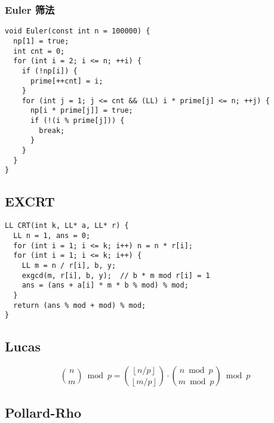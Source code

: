 \documentclass[a4paper,11pt,twoside,fontset = fandol,UTF8]{ctexbook} %
\begin{document}
\subsubsection{Euler 筛法}

\begin{lstlisting}
void Euler(const int n = 100000) {
  np[1] = true;
  int cnt = 0;
  for (int i = 2; i <= n; ++i) {
    if (!np[i]) {
      prime[++cnt] = i;
    }
    for (int j = 1; j <= cnt && (LL) i * prime[j] <= n; ++j) {
      np[i * prime[j]] = true;
      if (!(i % prime[j])) {
        break;
      }
    }
  }
}
\end{lstlisting}

\subsection{EXCRT}

\begin{lstlisting}
LL CRT(int k, LL* a, LL* r) {
  LL n = 1, ans = 0;
  for (int i = 1; i <= k; i++) n = n * r[i];
  for (int i = 1; i <= k; i++) {
    LL m = n / r[i], b, y;
    exgcd(m, r[i], b, y);  // b * m mod r[i] = 1
    ans = (ans + a[i] * m * b % mod) % mod;
  }
  return (ans % mod + mod) % mod;
}
\end{lstlisting}

\subsection{Lucas}
$$
\binom{n}{m}\bmod p = \binom{\left\lfloor n/p \right\rfloor}{\left\lfloor m/p\right\rfloor}\cdot\binom{n\bmod p}{m\bmod p}\bmod p 
$$

\subsection{Pollard-Rho}
\end{document}
